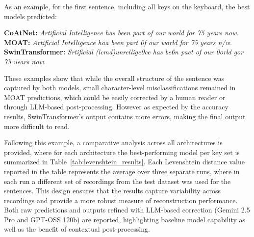 \documentclass[a4paper,11pt,twoside]{report}
\theoremstyle{definition}
\begin{document}
As an example, for the first sentence, including all keys on the keyboard, the best models predicted:

\begin{center}
\textbf{CoAtNet:} \textit{Artificial Intelligence has been part of our world for 75 years now.} \\
\textbf{MOAT:} \textit{Artificial Intelligence haa been part 0f our world for 75 years n/w.}
\textbf{SwinTransformer:} \textit{Srtificial (lcmd)unrellige0ce has be6n paet of our 0orld gor 75 uears now.}
\end{center}

These examples show that while the overall structure of the sentence was captured by both models, small character-level misclassifications remained in MOAT predictions, which could be easily corrected by a human reader or through LLM-based post-processing. However as expected by the accuracy results, SwinTransformer's output contains more errors, making the final output more difficult to read.

Following this example, a comparative analysis across all architectures is provided, where for each architecture the best-performing model per key set is summarized in Table~\ref{tab:levenshtein_results}. Each Levenshtein distance value reported in the table represents the average over three separate runs, where in each run a different set of recordings from the test dataset was used for the sentences. This design ensures that the results capture variability across recordings and provide a more robust measure of reconstruction performance. Both raw predictions and outputs refined with LLM-based correction (Gemini 2.5 Pro and GPT-OSS 120b) are reported, highlighting baseline model capability as well as the benefit of contextual post-processing.
\end{document}
